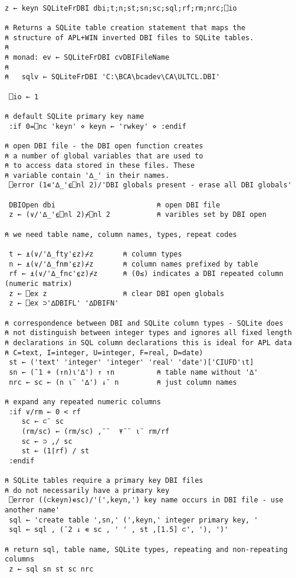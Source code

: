 \documentclass{article}
\begin{document}
\begin{lstlisting}[language=apl,extendedchars=true]

z ← keyn SQLiteFrDBI dbi;t;n;st;sn;sc;sql;rf;rm;nrc;⎕io

⍝ Returns a SQLite table creation statement that maps the
⍝ structure of APL+WIN inverted DBI files to SQLite tables.
⍝
⍝ monad: ev ← SQLiteFrDBI cvDBIFileName
⍝
⍝   sqlv ← SQLiteFrDBI 'C:\BCA\bcadev\CA\ULTCL.DBI'

 ⎕io ← 1

⍝ default SQLite primary key name
 :if 0=⎕nc 'keyn' ⋄ keyn ← 'rwkey' ⋄ :endif

⍝ open DBI file - the DBI open function creates
⍝ a number of global variables that are used to
⍝ to access data stored in these files. These
⍝ variable contain '∆_' in their names.
 ⎕error (1∊'∆_'⍷⎕nl 2)/'DBI globals present - erase all DBI globals'

 DBIOpen dbi                        ⍝ open DBI file
 z ← (∨/'∆_'⍷⎕nl 2)⌿⎕nl 2           ⍝ varibles set by DBI open

⍝ we need table name, column names, types, repeat codes

 t ← ⍎(∨/'∆_fty'⍷z)⌿z       ⍝ column types
 n ← ⍎(∨/'∆_fnm'⍷z)⌿z       ⍝ column names prefixed by table
 rf ← ⍎(∨/'∆_fnc'⍷z)⌿z      ⍝ (0≤) indicates a DBI repeated column (numeric matrix)
 z ← ⎕ex z                  ⍝ clear DBI open globals
 z ← ⎕ex ⊃'∆DBIFL' '∆DBIFN'

⍝ correspondence between DBI and SQLite column types - SQLite does
⍝ not distinguish between integer types and ignores all fixed length
⍝ declarations in SQL column declarations this is ideal for APL data
⍝ C=text, I=integer, U=integer, F=real, D=date)
 st ← ('text' 'integer' 'integer' 'real' 'date')['CIUFD'⍳t]
 sn ← (¯1 + (↑n)⍳'∆') ↑ ↑n          ⍝ table name without '∆'
 nrc ← sc ← (n ⍳¨ '∆') ↓¨ n         ⍝ just column names

⍝ expand any repeated numeric columns
 :if ∨/rm ← 0 < rf
    sc ← ⊂¨ sc
    (rm/sc) ← (rm/sc) ,¨¨  ⍕¨¨ ⍳¨ rm/rf
    sc ← ⊃ ,/ sc
    st ← (1⌈rf) / st
 :endif

⍝ SQLite tables require a primary key DBI files
⍝ do not necessarily have a primary key
 ⎕error ((⊂keyn)∊sc)/'(',keyn,') key name occurs in DBI file - use another name'
 sql ← 'create table ',sn,' (',keyn,' integer primary key, '
 sql ← sql , (¯2 ↓ ∊ sc , ' ' , st ,[1.5] ⊂', '), ')'

⍝ return sql, table name, SQLite types, repeating and non-repeating columns
 z ← sql sn st sc nrc
\end{lstlisting}
\end{document}
